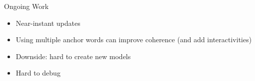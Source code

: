 \documentclass[compress]{beamer}
\begin{document}
\begin{frame}{Ongoing Work}

  \begin{itemize}
    \item Near-instant updates
    \item Using multiple anchor words can improve coherence (and add interactivities)
    \item Downside: hard to create new models
    \item Hard to debug
  \end{itemize}

\end{frame}
\end{document}
